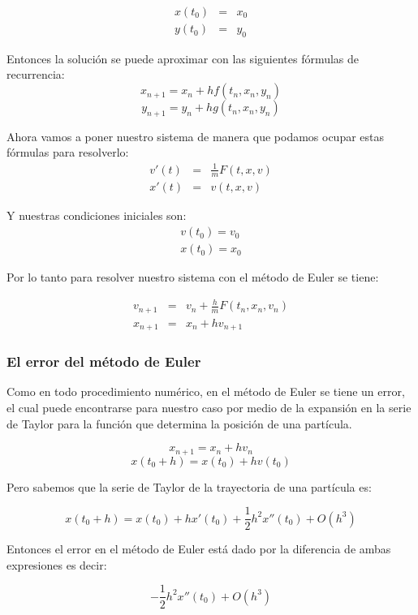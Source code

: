 \begin{eqnarray}
x(t_0) & = & x_0 \nonumber \\
y(t_0) & = & y_0
\label{condiciones:general}
\end{eqnarray}

Entonces la solución se puede aproximar con las siguientes fórmulas de recurrencia:
$$x_{n+1} = x_n + hf(t_n, x_n, y_n)$$
$$y_{n+1} = y_n + hg(t_n, x_n, y_n)$$

Ahora vamos a poner nuestro sistema de manera que podamos ocupar estas fórmulas para resolverlo:
\begin{eqnarray}
v'(t) & = & \frac{1}{m}F(t, x, v) \nonumber \\
x'(t) & = & v(t, x, v)
\label{sistema:particular}
\end{eqnarray}

Y nuestras condiciones iniciales son:
\begin{eqnarray}
v(t_0) = v_0 \nonumber \\
x(t_0) = x_0
\label{condiciones:particular}
\end{eqnarray}

Por lo tanto para resolver nuestro sistema con el método de Euler se tiene:

\begin{eqnarray}
v_{n+1} & = & v_n + \frac{h}{m}F(t_n, x_n, v_n)\nonumber \\
x_{n+1} & = & x_n + hv_{n + 1}
\label{formulas:Euler}
\end{eqnarray}

\subsubsection{El error del método de Euler}
Como en todo procedimiento numérico, en el método de Euler se tiene un error, el cual puede encontrarse para nuestro caso por medio de la expansión en la serie de Taylor para la función que determina la posición de una partícula.

$$x_{n+1}  =  x_n + hv_n$$
$$x(t_0 + h) = x(t_0) + h v(t_0)$$

Pero sabemos que la serie de Taylor de la trayectoria de una partícula es:

$$x(t_0 + h) = x(t_0) + h x'(t_0) + \frac{1}{2}h^2x''(t_0) + O(h^3)$$

Entonces el error en el método de Euler está dado por la diferencia de ambas expresiones es decir:

$$-\frac{1}{2}h^2x''(t_0) + O(h^3)$$


